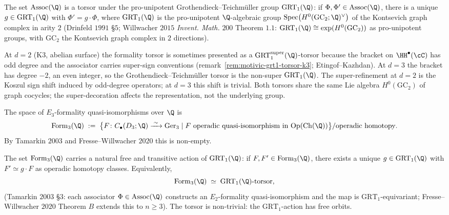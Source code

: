 \begin{theorem}
\label{thm:drinfeld-assoc-torsor}
\ClaimStatusTheorem
The set $\mathrm{Assoc}(\Q)$ is a torsor under the pro-unipotent
Grothendieck--Teichmüller group $\mathrm{GRT}_1(\Q)$: if
$\Phi, \Phi' \in \mathrm{Assoc}(\Q)$, there is a unique
$g \in \mathrm{GRT}_1(\Q)$ with $\Phi' = g \cdot \Phi$, where
$\mathrm{GRT}_1(\Q)$ is the pro-unipotent $\Q$-algebraic group
$\mathrm{Spec}\bigl(H^0(\mathrm{GC}_2; \Q)^\vee\bigr)$ of the
Kontsevich graph complex in arity $2$
(Drinfeld $1991$ §$5$; Willwacher $2015$ \textit{Invent. Math.} $200$
Theorem $1.1$: $\mathrm{GRT}_1(\Q) \cong \exp(H^0(\mathrm{GC}_2))$ as
pro-unipotent groups, with $\mathrm{GC}_2$ the Kontsevich graph complex
in $2$ directions).
\end{theorem}

\begin{remark}[Why $\mathrm{GRT}_1$ and not $\mathrm{GRT}_1^{\mathrm{super}}$ at $d = 3$]
\label{rem:grt1-vs-super-grt1-d3}
At $d = 2$ (K3, abelian surface) the formality torsor is sometimes
presented as a $\mathrm{GRT}_1^{\mathrm{super}}(\Q)$-torsor because the
bracket on $\HH^\bullet(\cC)$ has odd degree and the associator carries
super-sign conventions (remark~\ref{rem:motivic-grt1-torsor-k3};
Etingof--Kazhdan). At $d = 3$ the bracket has degree $-2$, an even
integer, so the Grothendieck--Teichmüller torsor is the non-super
$\mathrm{GRT}_1(\Q)$. The super-refinement at $d = 2$ is the Koszul sign
shift induced by odd-degree operators; at $d = 3$ this shift is trivial.
Both torsors share the same Lie algebra $H^0(\mathrm{GC}_2)$ of graph
cocycles; the super-decoration affects the representation, not the
underlying group.
\end{remark}

\begin{definition}
\label{def:e3-formality-space}
\ClaimStatusDefinitional
The space of $E_3$-formality quasi-isomorphisms over $\Q$ is
\[
 \mathrm{Form}_3(\Q)
 \;:=\;
 \bigl\{
  F \colon C_\bullet(D_3; \Q) \xrightarrow{\;\sim\;} \mathrm{Ger}_3
  \mid
  F \text{ operadic quasi-isomorphism in } \mathrm{Op}(\mathrm{Ch}(\Q))
 \bigr\}
 /
 \text{operadic homotopy}.
\]
By Tamarkin $2003$ and Fresse--Willwacher $2020$ this is non-empty.
\end{definition}

\begin{theorem}
\label{thm:form3-grt1-torsor}
\ClaimStatusTheorem
The set $\mathrm{Form}_3(\Q)$ carries a natural free and transitive
action of $\mathrm{GRT}_1(\Q)$: if $F, F' \in \mathrm{Form}_3(\Q)$, there
exists a unique $g \in \mathrm{GRT}_1(\Q)$ with $F' \simeq g \cdot F$ as
operadic homotopy classes. Equivalently,
\[
 \mathrm{Form}_3(\Q) \;\simeq\; \mathrm{GRT}_1(\Q)\text{-torsor},
\]
(Tamarkin $2003$ §$3$: each associator $\Phi \in \mathrm{Assoc}(\Q)$
constructs an $E_2$-formality quasi-isomorphism and the map is
$\mathrm{GRT}_1$-equivariant; Fresse--Willwacher $2020$ Theorem $B$
extends this to $n \geq 3$). The torsor is non-trivial: the
$\mathrm{GRT}_1$-action has free orbits.
\end{theorem}

